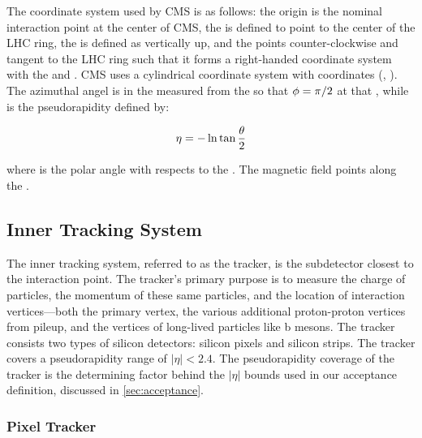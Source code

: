 The coordinate system used by CMS is as follows: the origin is the nominal
interaction point at the center of CMS, the \xaxis is defined to point to the
center of the LHC ring, the \yaxis is defined as vertically up, and the \zaxis
points counter-clockwise and tangent to the LHC ring such that it forms a
right-handed coordinate system with the \xaxis and \yaxis. CMS uses a
cylindrical coordinate system with coordinates (\coordeta, \coordphi). The
azimuthal angel \coordphi is in the \xyplane measured from the \xaxis so that
$\phi=\pi/2$ at that \xaxis, while \coordeta is the pseudorapidity defined
by:

\begin{equation}
    \eta = -\operatorname{ln} \tan \frac{\theta}{2}
\end{equation}

where \coordtheta is the polar angle with respects to the \zaxis. The magnetic
field points along the \zaxis.

\subsection{Inner Tracking System}

The inner tracking system, referred to as the tracker, is the subdetector
closest to the interaction point. The tracker's primary purpose is to measure
the charge of particles, the momentum of these same particles, and the location
of interaction vertices---both the primary vertex, the various additional
proton-proton vertices from pileup, and the vertices of long-lived particles
like b mesons. The tracker consists two types of silicon detectors: silicon
pixels and silicon strips. The tracker covers a pseudorapidity range of $|\eta|
< 2.4$. The pseudorapidity coverage of the tracker is the determining factor
behind the $|\eta|$ bounds used in our acceptance definition, discussed in
\cref{sec:acceptance}.

\subsubsection{Pixel Tracker}

